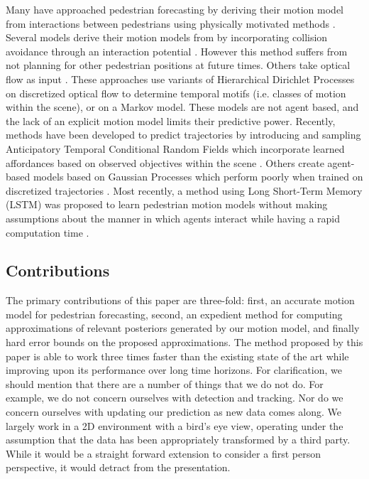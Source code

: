 \documentclass[letterpaper,10pt,conference]{ieeeconf}
\begin{document}
Many have approached pedestrian forecasting by deriving their motion model from interactions between pedestrians using physically motivated methods \cite{Helbing1995,Xu2012}. 
	Several models derive their motion models from \cite{Helbing1995} by incorporating collision avoidance through an interaction potential \cite{Pellegrini2009,Yamaguchi2011,Yi2016}. 
	However this method suffers from not planning for other pedestrian positions at future times. 
	Others take optical flow as input \cite{Hospedales2009,Wang2009,Emonet2011}.
	These approaches use variants of Hierarchical Dirichlet Processes on discretized optical flow to determine temporal motifs (i.e. classes of motion within the scene), or on a Markov model. 
	 These models are not agent based, and the lack of an explicit motion model limits their predictive power. 
	Recently, methods have been developed to predict trajectories by introducing and sampling Anticipatory Temporal Conditional Random Fields which incorporate learned affordances based on observed objectives within the scene \cite{Koppula2016}.
	 Others create agent-based models based on Gaussian Processes which perform poorly when trained on discretized trajectories \cite{Tay2008,Wang2008,Trautman2015}.
	Most recently, a method using Long Short-Term Memory (LSTM) was proposed to learn pedestrian motion models without making assumptions about the manner in which agents interact while having a rapid computation time \cite{Alahi2016}.

\subsection{Contributions}

The primary contributions of this paper are three-fold: first, an accurate motion model for pedestrian forecasting, second, an expedient method for computing approximations of relevant posteriors generated by our motion model, and finally hard error bounds on the proposed approximations.
The method proposed by this paper is able to work three times faster than the existing state of the art while improving upon its performance over long time horizons.
For clarification, we should mention that there are a number of things that we do not do.
For example, we do not concern ourselves with detection and tracking. 
Nor do we concern ourselves with updating our prediction as new data comes along.
We largely work in a 2D environment with a bird's eye view, operating under the assumption that the data has been appropriately transformed by a third party.
While it would be a straight forward extension to consider a first person perspective, it would detract from the presentation.
\end{document}
